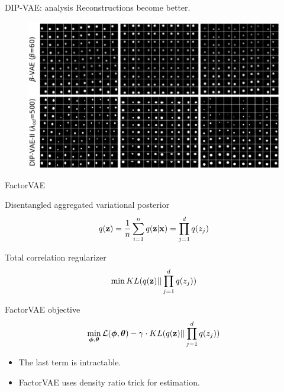 \documentclass{beamer}
\begin{document}
\begin{frame}{DIP-VAE: analysis}
	Reconstructions become better.
	\begin{figure}
		\centering
		\includegraphics[width=\linewidth]{figs/dip-vae_1}
	\end{figure}
	
\end{frame}
\begin{frame}{FactorVAE}
	\begin{block}{Disentangled aggregated variational posterior}
		\vspace{-0.3cm}
		\[
			q(\mathbf{z}) = \frac{1}{n} \sum_{i=1}^n q(\mathbf{z} | \mathbf{x}) = \prod_{j=1}^d q(z_j)
		\]
		\vspace{-0.3cm}
	\end{block}
	\begin{block}{Total correlation regularizer}
		\vspace{-0.3cm}
		\[
		\min KL(q(\mathbf{z}) || \prod_{j=1}^d q(z_j))
		\]
		\vspace{-0.3cm}
	\end{block}
	\begin{block}{FactorVAE objective}
		\vspace{-0.3cm}
		\[
		\min_{\boldsymbol{\phi}, \boldsymbol{\theta}} \mathcal{L}(\boldsymbol{\phi}, \boldsymbol{\theta}) - \gamma \cdot KL(q(\mathbf{z}) || \prod_{j=1}^d q(z_j))
		\]
		\vspace{-0.3cm}
	\end{block}
	\begin{itemize}
		\item The last term is intractable.
		\item FactorVAE uses density ratio trick for estimation. 
	\end{itemize}

\end{frame}
\end{document}
